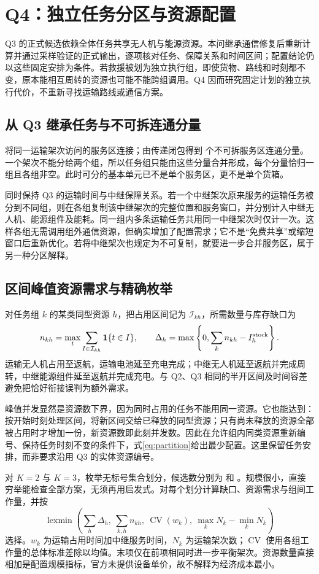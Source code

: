 \section{Q4：独立任务分区与资源配置}\label{sec:q4}
Q3 的正式候选依赖全体任务共享无人机与能源资源。本问继承通信修复后重新计算并通过采样验证的正式输出，逐项核对任务、保障关系和时间区间；配置结论仍以这些固定安排为条件。若救援被划为独立执行组，即使货物、路线和时刻都不变，原本能相互周转的资源也可能不能跨组调用。Q4 因而研究固定计划的独立执行代价，不重新寻找运输路线或通信方案。

\subsection{从 Q3 继承任务与不可拆连通分量}
将同一运输架次访问的服务区连接；由传递闭包得到 \AtomicGroups{} 个不可拆服务区连通分量。一个架次不能分给两个组，所以任务组只能由这些分量合并形成，每个分量恰归一组且各组非空。此时可分的基本单元已不是单个服务区，更不是单个货箱。

同时保持 Q3 的运输时间与中继保障关系。若一个中继架次原来服务的运输任务被分到不同组，则在各组复制该中继架次的完整位置和服务窗口，并分别计入中继无人机、能源组件及能耗。同一组内多条运输任务共用同一中继架次时仅计一次。这样各组无需调用组外通信资源，但确实增加了配置需求；它不是“免费共享”或缩短窗口后重新优化。若将中继架次也规定为不可复制，就要进一步合并服务区，属于另一种分区解释。

\subsection{区间峰值资源需求与精确枚举}
对任务组 $k$ 的某类同型资源 $h$，把占用区间记为 $\mathcal I_{kh}$，所需数量与库存缺口为
\begin{equation}
n_{kh}=\max_t\sum_{I\in\mathcal I_{kh}}\mathbf1\{t\in I\},\qquad
\Delta_h=\max\left\{0,\sum_kn_{kh}-I_h^{\rm stock}\right\}.\label{eq:partition}
\end{equation}
运输无人机占用至返航，运输电池延至充电完成；中继无人机延至返航并完成周转，中继能源组件延至返航并完成充电。与 Q2、Q3 相同的半开区间及时间容差避免把恰好衔接误判为额外需求。

峰值并发显然是资源数下界，因为同时占用的任务不能用同一资源。它也能达到：按开始时刻处理区间，将新区间交给已释放的同型资源；只有尚未释放的资源全部被占用时才增加一份，新资源数即此刻并发数。因此在允许组内同类资源重新编号、保持任务时刻不变的条件下，式\eqref{eq:partition}给出最少配置。这里保留任务安排，而非要求沿用 Q3 的实体资源编号。

对 $K=2$ 与 $K=3$，枚举无标号集合划分，候选数分别为 \PartitionsTwo{} 和 \PartitionsThree{}。规模很小，直接穷举能检查全部方案，无须再用启发式。对每个划分计算缺口、资源需求与组间工作量，并按
\begin{equation}
\operatorname{lexmin}\left(\sum_h\Delta_h,\ \sum_{k,h}n_{kh},\
\operatorname{CV}(w_k),\ \max_kN_k-\min_kN_k\right)\label{eq:q4objective}
\end{equation}
选择。$w_k$ 为运输占用时间加中继服务时间，$N_k$ 为运输架次数；$\operatorname{CV}$ 使用各组工作量的总体标准差除以均值。末项仅在前项相同时进一步平衡架次。资源数量直接相加是配置规模指标，官方未提供设备单价，故不解释为经济成本最小。


